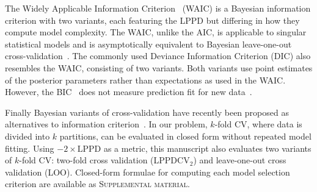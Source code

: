 \documentclass{IOS-Book-Article}
\begin{document}
The Widely Applicable Information Criterion~\cite{watanabe2010asymptotic,watanabe2013widely} (WAIC) is a Bayesian information criterion with two variants, each featuring the LPPD but differing in how they compute model complexity.  The WAIC, unlike the AIC, is applicable to singular statistical models and is asymptotically equivalent to Bayesian leave-one-out cross-validation~\cite{watanabe2010asymptotic}. The commonly used Deviance Information Criterion (DIC) also resembles the WAIC,  consisting of two variants. Both variants use point estimates of the posterior parameters rather than expectations as used in the WAIC.
However, the BIC~\cite{narlikar2013one} does not measure prediction fit for new data~\cite{gelman2014understanding}.

Finally Bayesian variants of cross-validation have recently been proposed as alternatives to information criterion~\cite{gelman2014understanding}.  In our problem, $k$-fold CV, where data is divided into $k$ partitions, can be evaluated in closed form without repeated model fitting. Using $-2\times \textrm{LPPD}$ as a metric, this manuscript also evaluates two variants of $k$-fold CV:
two-fold cross validation (LPPDCV$_2$) and leave-one-out cross validation (LOO).  Closed-form formulae for computing each model selection criterion are available as \textsc{Supplemental material}. 
\end{document}
